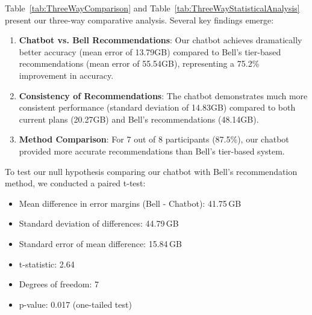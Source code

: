 \documentclass[conference]{IEEEtran}
\begin{document}
\begin{table}[ht!]
\centering
\scriptsize
\caption{Statistical Comparison Between All Three Recommendation Methods}
\label{tab:ThreeWayStatisticalAnalysis}
\end{table}

Table~\ref{tab:ThreeWayComparison} and Table~\ref{tab:ThreeWayStatisticalAnalysis} present our three-way comparative analysis. Several key findings emerge:

\begin{enumerate}
    \item \textbf{Chatbot vs. Bell Recommendations}: Our chatbot achieves dramatically better accuracy (mean error of 13.79GB) compared to Bell's tier-based recommendations (mean error of 55.54GB), representing a 75.2\% improvement in accuracy.
    
    \item \textbf{Consistency of Recommendations}: The chatbot demonstrates much more consistent performance (standard deviation of 14.83GB) compared to both current plans (20.27GB) and Bell's recommendations (48.14GB).
    
    \item \textbf{Method Comparison}: For 7 out of 8 participants (87.5\%), our chatbot provided more accurate recommendations than Bell's tier-based system.
\end{enumerate}

To test our null hypothesis comparing our chatbot with Bell's recommendation method, we conducted a paired t-test:

\begin{itemize}
    \item Mean difference in error margins (Bell - Chatbot): 41.75\,GB
    \item Standard deviation of differences: 44.79\,GB
    \item Standard error of mean difference: 15.84\,GB
    \item t-statistic: 2.64
    \item Degrees of freedom: 7
    \item p-value: 0.017 (one-tailed test)
\end{itemize}
\end{document}
